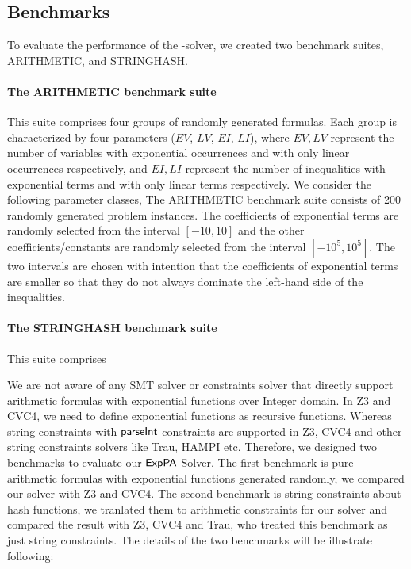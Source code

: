\subsection{Benchmarks}

To evaluate the performance of the {\paexp}-solver, we created two benchmark suites, ARITHMETIC, and STRINGHASH.

\paragraph{The ARITHMETIC benchmark suite} 
This suite comprises four groups of randomly generated {\paexp} formulas. Each group is characterized by four parameters ($EV$, $LV$, $EI$, $LI$), where $EV, LV$ represent the number of variables with exponential occurrences and with only linear occurrences respectively, and $EI, LI$ represent the number of inequalities with exponential terms and with only linear terms respectively. 
We consider the following parameter classes, 
The ARITHMETIC benchmark suite consists of 200 randomly generated problem instances. The coefficients of exponential terms are randomly selected from the interval $[-10, 10]$ and the other coefficients/constants are randomly selected from the interval $[-10^5, 10^5]$. The two intervals are chosen with intention that the coefficients of exponential terms are smaller so that they do not always dominate the left-hand side of the inequalities. 

%

\paragraph{The STRINGHASH benchmark suite} 
This suite comprises 


We are not aware of any SMT solver or constraints solver that directly support arithmetic formulas with exponential functions over Integer domain. In Z3 and CVC4, we need to define exponential functions as recursive functions. Whereas string constraints with $\textsf{parseInt}$ constraints are supported in Z3, CVC4 and other string constraints solvers like Trau, HAMPI etc. Therefore, we designed two benchmarks to evaluate our ${\sf ExpPA}$-Solver. The first benchmark is pure arithmetic formulas with exponential functions generated randomly, we compared our solver with Z3 and CVC4. The second benchmark is string constraints about hash functions, we tranlated them to arithmetic constraints for our solver and compared the result with Z3, CVC4 and Trau, who treated this benchmark as just string constraints. The details of the two benchmarks will be illustrate following:


